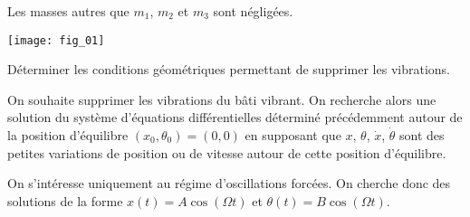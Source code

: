 Les masses autres que $m_1$, $m_2$ et $m_3$ sont négligées.



\begin{marginfigure}
\texttt{[image: fig\_01]}
\end{marginfigure}

\begin{obj}
Déterminer les conditions géométriques permettant de supprimer les vibrations.
\end{obj}

\ifprof
\begin{corrige}
\end{corrige}
\else
\fi


\ifprof
\begin{corrige}
\end{corrige}
\else
\fi


\ifprof
\begin{corrige}
\end{corrige}
\else
\fi
On souhaite supprimer les vibrations du bâti vibrant. On recherche alors une solution du système d’équations différentielles
déterminé précédemment autour de la position d’équilibre $\left(x_0,\theta_0\right)=(0,0)$ en supposant que $x$, $\theta$, $\dot{x}$, $\dot{\theta}$ sont des petites variations
de position ou de vitesse autour de cette position d’équilibre.


\ifprof
\begin{corrige}
\end{corrige}
\else
\fi

On s’intéresse uniquement au régime d’oscillations forcées. On cherche donc des solutions de la forme $x(t)=A\cos\left( \Omega t \right)$ et $\theta(t)=B\cos\left( \Omega t \right)$.


\ifprof
\begin{corrige}
\end{corrige}
\else
\fi



\ifprof
\begin{corrige}
\end{corrige}
\else
\fi




